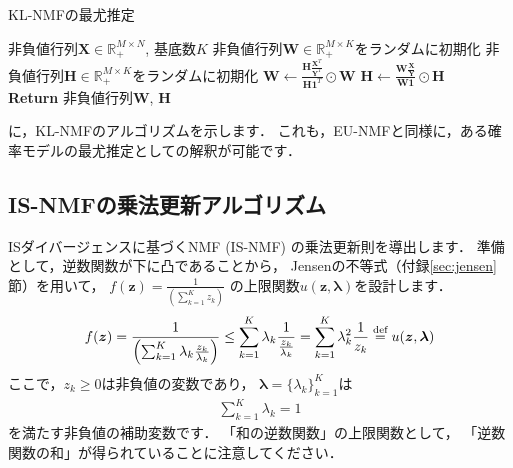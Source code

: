 \begin{algobox}{KL-NMFの最尤推定}
\label{algo:kl-nmf-ml}
\begin{algorithmic}[1]
\Require 非負値行列$\bm{X} \in \mathbb{R}_+^{M \times N}$, 基底数$K$
\State 非負値行列$\bm{W} \in \mathbb{R}_+^{M \times K}$をランダムに初期化
\State 非負値行列$\bm{H} \in \mathbb{R}_+^{M \times K}$をランダムに初期化
\State $\displaystyle \bm{W} \gets \frac{\bm{H} \frac{\bm{X}^T}{\bm{Y}^T}}{\bm{H}\bm{1}^T} \odot \bm{W}$ 
\State $\displaystyle \bm{H} \gets \frac{\bm{W} \frac{\bm{X}}{\bm{Y}}}{\bm{W}\bm{1}} \odot \bm{H}$ 
\EndWhile\\
{\bf Return} 非負値行列$\bm{W}$, $\bm{H}$
\end{algorithmic}
\end{algobox}
に，KL-NMFのアルゴリズムを示します．
これも，EU-NMFと同様に，ある確率モデルの最尤推定としての解釈が可能です．

\subsection{IS-NMFの乗法更新アルゴリズム}

ISダイバージェンスに基づくNMF (IS-NMF) の乗法更新則を導出します．
準備として，逆数関数が下に凸であることから，
Jensenの不等式（付録\ref{sec:jensen}節）を用いて，
$f(\bm{z})=\frac{1}{\left(\sum_{k=1}^K z_k \right)}$
の上限関数$u(\bm{z},\bm\lambda)$を設計します．
\begin{align}
f(\bm{z}) 
= \frac{1}{\left(\sum_{k=1}^K \lambda_k \frac{z_k}{\lambda_k} \right)}
\le \sum_{k=1}^K \lambda_k \frac{1}{\frac{z_k}{\lambda_k}}
= \sum_{k=1}^K \lambda_k^2 \frac{1}{z_k}
\overset{\mbox{\scriptsize{def}}}{=}
u(\bm{z},\bm\lambda)
\label{eqn:inv_aux}
\end{align}
ここで，$z_k \ge 0$は非負値の変数であり，
$\bm\lambda = \{\lambda_k\}_{k=1}^K$は
\begin{align}
\sum_{k=1}^K \lambda_k = 1
\label{eqn:is_lambda_constraint}
\end{align}
を満たす非負値の補助変数です．
「和の逆数関数」の上限関数として，
「逆数関数の和」が得られていることに注意してください．

